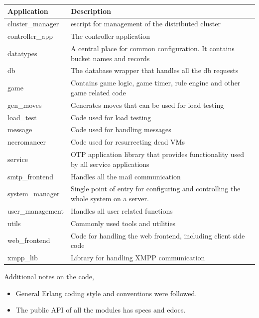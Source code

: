 \documentclass[11pt,a4paper]{report}
\begin{document}
\begin{center}
    \begin{tabular}{ | l | p{10cm} |}
    \hline
    Application & Description \\ \hline \hline
    cluster\_manager & escript for management of the distributed
    cluster \\ \hline
    controller\_app & The controller application \\ \hline
    datatypes & A central place for common configuration. It contains bucket
    names and records \\ \hline
    db & The database wrapper that handles all the db requests\\ \hline
    game & Contains game logic, game timer, rule engine and other game
    related code \\ \hline
    gen\_moves & Generates moves that can be used for load testing \\ \hline
    load\_test & Code used for load testing \\ \hline
    message & Code used for handling messages \\ \hline
    necromancer & Code used for resurrecting dead VMs \\ \hline
    service &  OTP application library that provides functionality used by
    all service applications \\ \hline
    smtp\_frontend & Handles all the mail communication \\ \hline
    system\_manager & Single point of entry for configuring and controlling
    the whole system on a server. \\ \hline
    user\_management & Handles all user related functions \\ \hline
    utils & Commonly used tools and utilities \\ \hline
    web\_frontend & Code for handling the web frontend, including client
    side code \\ \hline
    xmpp\_lib & Library for handling XMPP communication \\ \hline \hline
    \end{tabular}
\end{center}



Additional notes on the code,

\begin{itemize}
\item General Erlang coding style and conventions were followed.
\item The public API of all the modules has specs and edocs.
\end{itemize}
\end{document}
